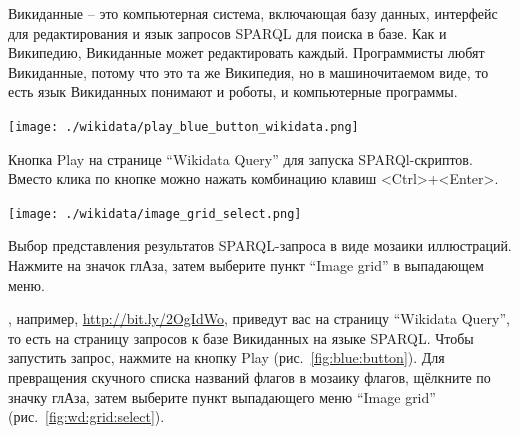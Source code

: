 \begin{mdfstyle}[nobreak=true,frametitle=На каком языке компьютеры читают Википедию?]
\sloppy 
    Викиданные -- это компьютерная система, включающая базу данных, интерфейс для редактирования и язык запросов SPARQL для поиска в базе. Как и Википедию, Викиданные может редактировать каждый. Программисты любят Викиданные, потому что это та же Википедия, но в машиночитаемом виде, то есть язык Викиданных понимают и роботы, и компьютерные программы.
\end{mdfstyle}

\begin{marginfigure}[-4cm]
\texttt{[image: ./wikidata/play\_blue\_button\_wikidata.png]}

    \caption[Кнопка Play на странице выполнения SPARQL-запросов к Викиданным]{Кнопка 
    Play на странице ``Wikidata Query'' для запуска SPARQl-скриптов.
    Вместо клика по кнопке можно нажать комбинацию клавиш <Ctrl>+<Enter>.}
  \label{fig:blue:button}
\end{marginfigure}

\begin{marginfigure}[-0cm]
  \texttt{[image: ./wikidata/image\_grid\_select.png]}
  \caption[Выбор представления результатов SPARQL-запроса в виде мозаики 
    иллюстраций.]{Выбор представления результатов SPARQL-запроса 
    в виде мозаики иллюстраций. Нажмите на значок глАза, затем выберите 
    пункт ``Image grid'' в выпадающем меню.
}
  \label{fig:wd:grid:select}
\end{marginfigure}


, например, \url{http://bit.ly/2OgIdWo}, 
приведут вас на страницу ``Wikidata Query'', 
то есть на страницу запросов к базе Викиданных на языке SPARQL. 
Чтобы запустить запрос, нажмите на кнопку Play (рис.~\ref{fig:blue:button}). 
Для превращения скучного списка названий флагов в мозаику флагов, 
щёлкните по значку глАза, затем выберите пункт выпадающего меню 
``Image grid'' (рис.~\ref{fig:wd:grid:select}).%





